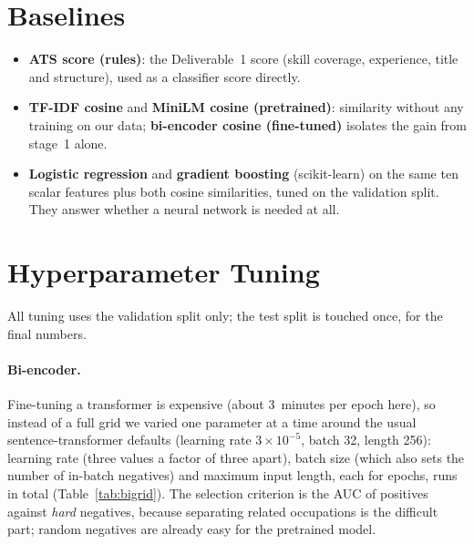 \documentclass[11pt,a4paper]{article}
\begin{document}
\section{Baselines}
\begin{itemize}
\item \textbf{ATS score (rules)}: the Deliverable~1 score (skill coverage, experience, title and
structure), used as a classifier score directly.
\item \textbf{TF-IDF cosine} and \textbf{MiniLM cosine (pretrained)}: similarity without any training
on our data; \textbf{bi-encoder cosine (fine-tuned)} isolates the gain from stage~1 alone.
\item \textbf{Logistic regression} and \textbf{gradient boosting} (scikit-learn) on the same ten
scalar features plus both cosine similarities, tuned on the validation split. They answer whether a
neural network is needed at all.
\end{itemize}

\section{Hyperparameter Tuning}\label{sec:tuning}
All tuning uses the validation split only; the test split is touched once, for the final numbers.

\paragraph{Bi-encoder.} Fine-tuning a transformer is expensive (about 3~minutes per epoch here),
so instead of a full grid we varied one parameter at a time around the usual sentence-transformer
defaults (learning rate $3\times10^{-5}$, batch 32, length 256): learning rate (three values a
factor of three apart), batch size (which also sets the number of in-batch negatives) and maximum
input length, each for \BiEpochs epochs, \BiRuns runs in total (Table~\ref{tab:bigrid}). The selection criterion is the AUC
of positives against \emph{hard} negatives, because separating related occupations is the difficult
part; random negatives are already easy for the pretrained model.


\end{document}

